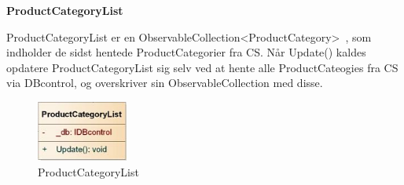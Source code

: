\textbf{ProductCategoryList}

ProductCategoryList er en ObservableCollection<ProductCategory>~\cite{ObsCol}, som indholder de sidst hentede ProductCategorier fra \gls{CS}. Når Update() kaldes opdatere ProductCategoryList sig selv ved at hente alle ProductCateogies fra \gls{CS} via DBcontrol, og overskriver sin ObservableCollection med disse.

\begin{figure}[H]
    \centering
    \includegraphics[width=30mm]{Systemdesign/Frontend/BLL/Pics/ProductCategoryList}
    \caption{ProductCategoryList}
    \label{fig:ProductCategoryList}
\end{figure}

\bigskip